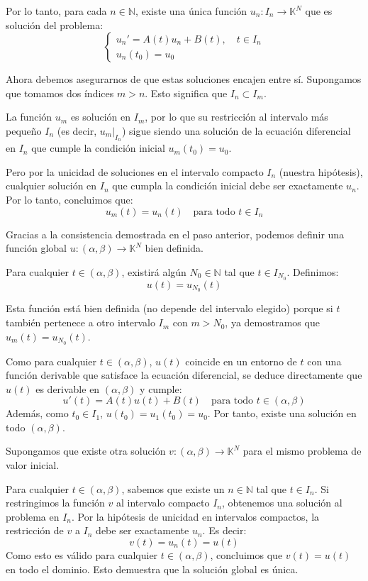 {    Por lo tanto, para cada $n \in \mathbb{N}$, existe una única función $u_n: I_n \to \mathbb{K}^N$ que es solución del problema:
    \[
    \begin{cases} u_n' = A(t)u_n + B(t), \quad t \in I_n \\ u_n(t_0) = u_0 \end{cases}
    \]

    Ahora debemos asegurarnos de que estas soluciones encajen entre sí. Supongamos que tomamos dos índices $m > n$. Esto significa que $I_n \subset I_m$. 

    La función $u_m$ es solución en $I_m$, por lo que su restricción al intervalo más pequeño $I_n$ (es decir, $u_m|_{I_n}$) sigue siendo una solución de la ecuación diferencial en $I_n$ que cumple la condición inicial $u_m(t_0) = u_0$. 

    Pero por la unicidad de soluciones en el intervalo compacto $I_n$ (nuestra hipótesis), cualquier solución en $I_n$ que cumpla la condición inicial debe ser exactamente $u_n$. Por lo tanto, concluimos que:
    \[
    u_m(t) = u_n(t) \quad \text{para todo } t \in I_n
    \]

    Gracias a la consistencia demostrada en el paso anterior, podemos definir una función global $u: (\alpha, \beta) \to \mathbb{K}^N$ bien definida. 

    Para cualquier $t \in (\alpha, \beta)$, existirá algún $N_0 \in \mathbb{N}$ tal que $t \in I_{N_0}$. Definimos:
    \[
    u(t) = u_{N_0}(t)
    \]

    Esta función está bien definida (no depende del intervalo elegido) porque si $t$ también pertenece a otro intervalo $I_m$ con $m > N_0$, ya demostramos que $u_m(t) = u_{N_0}(t)$. 

    Como para cualquier $t \in (\alpha, \beta)$, $u(t)$ coincide en un entorno de $t$ con una función derivable que satisface la ecuación diferencial, se deduce directamente que $u(t)$ es derivable en $(\alpha, \beta)$ y cumple:
    \[
    u'(t) = A(t)u(t) + B(t) \quad \text{para todo } t \in (\alpha, \beta)
    \]
    Además, como $t_0 \in I_1$, $u(t_0) = u_1(t_0) = u_0$. Por tanto,  existe una solución en todo $(\alpha, \beta)$.

    Supongamos que existe otra solución $v: (\alpha, \beta) \to \mathbb{K}^N$ para el mismo problema de valor inicial. 

    Para cualquier $t \in (\alpha, \beta)$, sabemos que existe un $n \in \mathbb{N}$ tal que $t \in I_n$. Si restringimos la función $v$ al intervalo compacto $I_n$, obtenemos una solución al problema en $I_n$. 
    Por la hipótesis de unicidad en intervalos compactos, la restricción de $v$ a $I_n$ debe ser exactamente $u_n$. Es decir:
    \[
    v(t) = u_n(t) = u(t)
    \]
    Como esto es válido para cualquier $t \in (\alpha, \beta)$, concluimos que $v(t) = u(t)$ en todo el dominio. Esto demuestra que la solución global es única.
}


